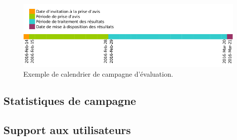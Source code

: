 \documentclass[a4paper,11pt]{report}
\begin{document}

\begin{figure}[ht]
\includegraphics[width=\linewidth]{timeline_exemple.png}
\caption{Exemple de calendrier de campagne d'évaluation.}
\label{fig:calendrier-exemple}
\end{figure}












\subsection{Statistiques de campagne}






\subsection{Support aux utilisateurs}
\end{document}
